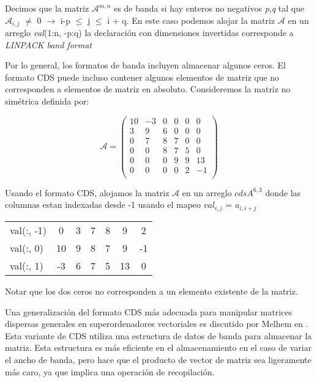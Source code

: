 \documentclass[a4paper,openright,12pt, oneside]{book}
\newcommand{\implica}{\rightarrow}
\begin{document}
Decimos que la matriz $\mathcal{A}^{m,n}$ es de banda si hay enteros no negativos \textit{p},\textit{q} tal que $\mathcal{A}_{i,j}$ $\neq$ 0 $\implica$ i-p $\leq$ j $\leq$ i + q. En este caso podemos alojar la matriz $\mathcal{A}$ en un arreglo \textit{val}(1:n, -p:q) la declaraci\'on con dimensiones invertidas corresponde a \textit{LINPACK band format} \cite{LINPACK}

Por lo general, los formatos de banda incluyen almacenar algunos ceros. El formato CDS puede incluso contener algunos elementos de matriz que no corresponden a elementos de matriz en absoluto. Consideremos la matriz no simétrica definida por:

\begin{equation}
\mathcal{A} =
\left(
\begin{array}{cccccc}
 
10& -3& 0& 0& 0& 0\\
3&   9& 6& 0& 0& 0 \\
0&   7& 8& 7& 0& 0 \\
0&   0& 8& 7& 5& 0 \\
0&   0& 0& 9& 9& 13 \\
0&   0& 0& 0& 2& -1 \\
\end{array}
\right)
\end{equation}

Usando el formato CDS, alojamos la matriz $\mathcal{A}$ en un arreglo \textit{$cdsA^{6, 3}$} donde las columnas estan indexadas desde -1 usando el mapeo $val_{i, j}$ = $a_{i, i+j}$

\begin{tabular}{ l || c | c | c | c | c | c}
  val(:, -1) & 0 & 3 & 7 & 8 & 9 & 2 \\
  val(:, 0) & 10 & 9 & 8 & 7 & 9 & -1 \\
  val(:, 1) & -3 & 6 & 7 & 5 & 13 & 0 \\
\end{tabular}

Notar que los dos ceros no corresponden a un elemento existente de la matriz.

Una generalizaci\'on del formato CDS m\'as adecuada para manipular matrices dispersas generales en superordenadores vectoriales es discutido por Melhem en \cite{MELHEM}. Esta variante de CDS utiliza una estructura de datos de banda para almacenar la matriz. Esta estructura es m\'as eficiente en el almacenamiento en el caso de variar el ancho de banda, pero hace que el producto de vector de matriz sea ligeramente m\'as caro, ya que implica una operaci\'on de recopilaci\'on.
\end{document}
